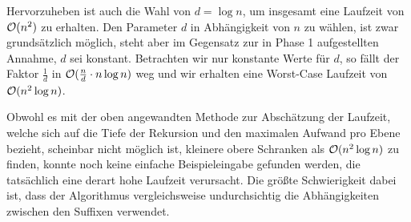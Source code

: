 Hervorzuheben ist auch die Wahl von \(d = \log n\), um insgesamt eine Laufzeit von \(\mathcal{O}(n^2)\) zu erhalten. Den Parameter \(d\) in Abhängigkeit von \(n\) zu wählen, ist zwar grundsätzlich möglich, steht aber im Gegensatz zur in Phase 1 aufgestellten Annahme, \(d\) sei konstant. Betrachten wir nur konstante Werte für \(d\), so fällt der Faktor \(\frac 1 d\) in \(\mathcal{O}(\frac n d \cdot n \log n)\) weg und wir erhalten eine Worst-Case Laufzeit von \(\mathcal{O}(n^2\log n)\).\par\smallskip
Obwohl es mit der oben angewandten Methode zur Abschätzung der Laufzeit, welche sich auf die Tiefe der Rekursion und den maximalen Aufwand pro Ebene bezieht, scheinbar nicht möglich ist, kleinere obere Schranken als \(\mathcal{O}(n^2 \log n)\) zu finden, konnte noch keine einfache Beispieleingabe gefunden werden, die tatsächlich eine derart hohe Laufzeit verursacht. Die größte Schwierigkeit dabei ist, dass der Algorithmus vergleichsweise undurchsichtig die Abhängigkeiten zwischen den Suffixen verwendet.
